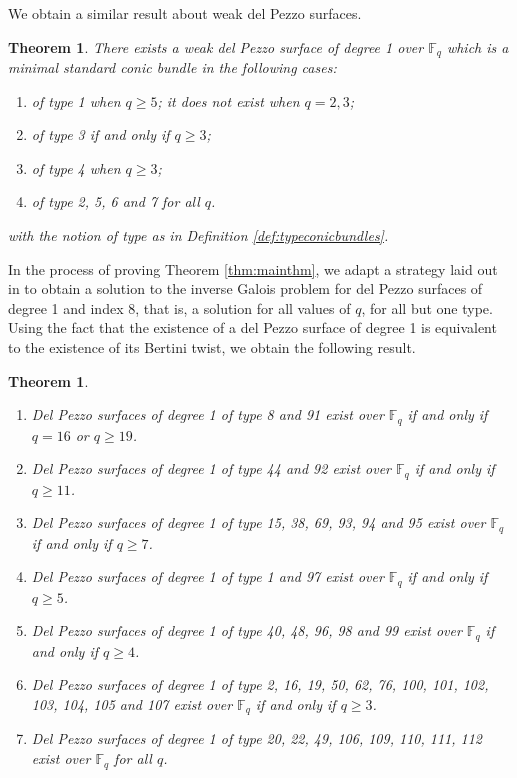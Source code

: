 \documentclass[a4paper, 11pt, reqno]{amsart}
\numberwithin{equation}{section} \numberwithin{figure}{section}
\def \F {{\mathbb F}}
\newtheorem{theorem}[lemma]{Theorem}
\theoremstyle{definition}
\numberwithin{lemma}{section}
\begin{document}
We obtain a similar result about weak del Pezzo surfaces.

\begin{theorem}\label{thm:weakdPexistence}
    There exists a weak del Pezzo surface of degree 1 over $\F_q$ which is a minimal standard conic bundle in the following cases:
    \begin{enumerate}[label=(\roman*)]
        \item of type 1 when $q \geq 5$; it does not exist when $q = 2, 3$;
        \item of type 3 if and only if $q \geq 3$;
        \item of type 4 when $q \geq 3$;
        \item of type 2, 5, 6 and 7 for all $q$.
    \end{enumerate}
    with the notion of type as in Definition \ref{def:typeconicbundles}.
\end{theorem}

In the process of proving Theorem \ref{thm:mainthm}, we adapt a strategy laid out in \cite[\S5.2]{BFL} to obtain a solution to the inverse Galois problem for del Pezzo surfaces of degree 1 and index 8, that is, a solution for all values of $q$, for all but one type. Using the fact that the existence of a del Pezzo surface of degree 1 is equivalent to the existence of its Bertini twist, we obtain the following result.

\begin{theorem}\label{thm:index8+twist}
\begin{enumerate}
    \item Del Pezzo surfaces of degree 1 of type 8 and 91 exist over $\F_q$ if and only if $q = 16$ or $q \geq 19$.
    \item Del Pezzo surfaces of degree 1 of type 44 and 92 exist over $\F_q$ if and only if $q \geq 11$.
    \item Del Pezzo surfaces of degree 1 of type 15, 38, 69, 93, 94 and 95 exist over $\F_q$ if and only if $q \geq 7$.
    \item Del Pezzo surfaces of degree 1 of type 1 and 97 exist over $\F_q$ if and only if $q \geq 5$.
    \item Del Pezzo surfaces of degree 1 of type 40, 48, 96, 98 and 99 exist over $\F_q$ if and only if $q \geq 4$.
    \item Del Pezzo surfaces of degree 1 of type 2, 16, 19, 50, 62, 76, 100, 101, 102, 103, 104, 105 and 107 exist over $\F_q$ if and only if $q \geq 3$.
    \item Del Pezzo surfaces of degree 1 of type 20, 22, 49, 106, 109, 110, 111, 112 exist over $\F_q$ for all $q$.
\end{enumerate}
\end{theorem}
\end{document}
